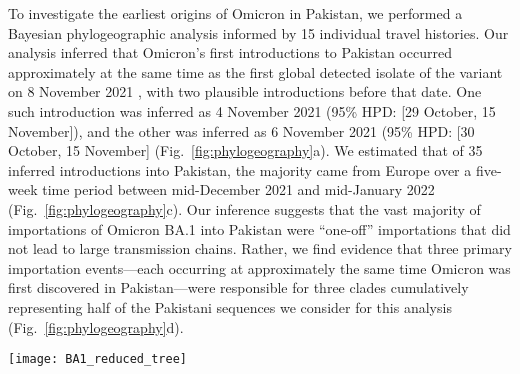 To investigate the earliest origins of Omicron in Pakistan, we performed a Bayesian phylogeographic analysis informed by 15 individual travel histories.
Our analysis inferred that Omicron's first introductions to Pakistan occurred approximately at the same time as the first global detected isolate of the variant on 8 November 2021 \citep{dyer2021covid}, with two plausible introductions before that date.
One such introduction was inferred as 4 November 2021 (95\% HPD: [29 October, 15 November]), and the other was inferred as 6 November 2021 (95\% HPD: [30 October, 15 November] (Fig.~\ref{fig:phylogeography}a).
We estimated that of 35 inferred introductions into Pakistan, the majority came from Europe over a five-week time period between mid-December 2021 and mid-January 2022 (Fig.~\ref{fig:phylogeography}c).
Our inference suggests that the vast majority of importations of Omicron BA.1 into Pakistan were ``one-off'' importations that did not lead to large transmission chains.
Rather, we find evidence that three primary importation events---each occurring at approximately the same time Omicron was first discovered in Pakistan---were responsible for three clades cumulatively representing half of the Pakistani sequences we consider for this analysis (Fig.~\ref{fig:phylogeography}d).

\begin{sidewaysfigure*}[!hpt]
   \centering
   \texttt{[image: BA1\_reduced\_tree]}
    \caption[Pakistan Bayesian phylogeography results]{Results of our Bayesian phylogeographic analysis. (A) time-calibrated, reduced maximum clade credibility phylogenetic tree where all taxa from non-Pakistan (or travel history) locations have been hidden. Branches along the tree remain colored by the inferred region of the ancestral strain. The three large Pakistani clades cumulatively representing roughly half of the Pakistani sequences considered in this analysis all extend from European backbone (yellow). (B) distribution of importations to Pakistan by region. (C) Distribution over time of the inferred number of weekly importations to Pakistan, divided by inferred source. (D) individual Pakistani clade count distribution in the MCC tree; most clades are inferred as singletons, representing roughly half of the sequences in the tree.}
    \label{fig:phylogeography}
\end{sidewaysfigure*}

